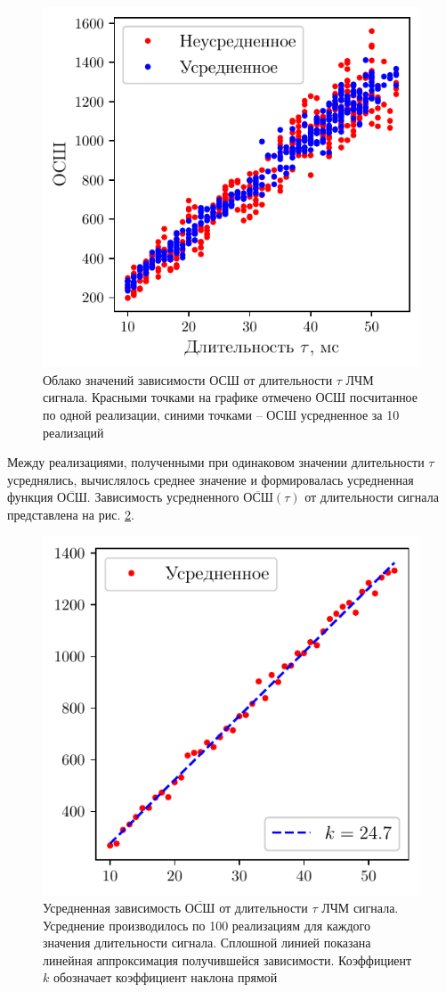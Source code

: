\begin{figure}[h!]
    \centering
    \includegraphics[width=0.6\linewidth]{imgs/task4/t4f1} 
    \caption{Облако значений зависимости ОСШ от длительности $\tau$ ЛЧМ
    сигнала. Красными точками на графике отмечено ОСШ посчитанное по одной
    реализации, синими точками -- ОСШ усредненное за 10 реализаций }
    \label{fig:4.1}
\end{figure}


\newcommand{\mSNR}{\overline{\text{ОСШ}}}
Между реализациями, полученными при одинаковом значении длительности $\tau$
усреднялись, вычислялось среднее значение и формировалась усредненная функция
$\mSNR$. Зависимость усредненного 
$\mSNR(\tau)$ от длительности сигнала представлена на рис. \ref{fig:4.2}.

\begin{figure}[h!]
    \centering
    \includegraphics[width=0.6\linewidth]{imgs/task4/t4f2}
    \caption{Усредненная зависимость $\mSNR$ от длительности $\tau$ ЛЧМ
        сигнала. Усреднение производилось по 100 реализациям для каждого
        значения длительности сигнала.  Сплошной линией показана линейная
        аппроксимация получившейся зависимости. Коэффициент $k$ обозначает
        коэффициент наклона прямой}
    \label{fig:4.2}
\end{figure}

